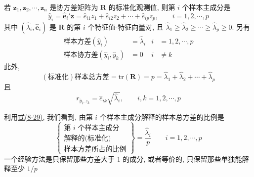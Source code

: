 \begin{mvbox}
若 $\mathbf{z}_1,\mathbf{z}_2,\cdots,\mathbf{z}_n$ 是协方差矩阵为 $\mathbf{R}$ 的标准化观测值, 则第 $i$ 个样本主成分是
\[
\hat{y}_i=\hat{\mathbf{e}}_i'\mathbf{z}=\hat{e}_{i1}z_1+\hat{e}_{i2}z_2+\cdots+\hat{e}_{ip}z_p,\qquad i=1,2,\cdots,p
\]
其中 $(\hat{\lambda}_i,\hat{\mathbf{e}}_i)$ 是 $\mathbf{R}$ 的第 $i$ 个特征值-特征向量对, 且 $\hat{\lambda}_1\geqslant\hat{\lambda}_2\geqslant\cdots\geqslant\hat{\lambda}_p\geqslant 0$. 另有
\label{eq:8-29}
\begin{equation}
\begin{aligned}
\text{样本方差}(\hat{y}_i)&=\hat{\lambda}_i & i&=1,2,\cdots,p\\
\text{样本协方差}(\hat{y}_i,\hat{y}_k)&=0 & i&\neq k
\end{aligned}
\tag{8-29}
\end{equation}
此外,
\[
(\text{标准化})\text{样本总方差}=\mathrm{tr}(\mathbf{R})=p=\hat{\lambda}_1+\hat{\lambda}_2+\cdots+\hat{\lambda}_p
\]
且
\[
r_{\hat{y}_i,z_k}=\hat{e}_{ik}\sqrt{\hat{\lambda}_i},\qquad i,k=1,2,\cdots,p
\]
\end{mvbox}

利用\hyperref[eq:8-29]{式(8-29)}, 我们看到, 由第 $i$ 个样本主成分解释的样本总方差的比例是
\label{eq:8-30}
\begin{equation}
\left\{\begin{array}{l}
\text{第 } i \text{ 个样本主成分}\\
\text{解释的(标准化)}\\
\text{样本方差所占的比例}
\end{array}\right\}
=\frac{\hat{\lambda}_i}{p}\qquad i=1,2,\cdots,p \tag{8-30}
\end{equation}
一个经验方法是只保留那些方差大于 1 的成分, 或者等价的, 只保留那些单独能解释至少 $1/p$
